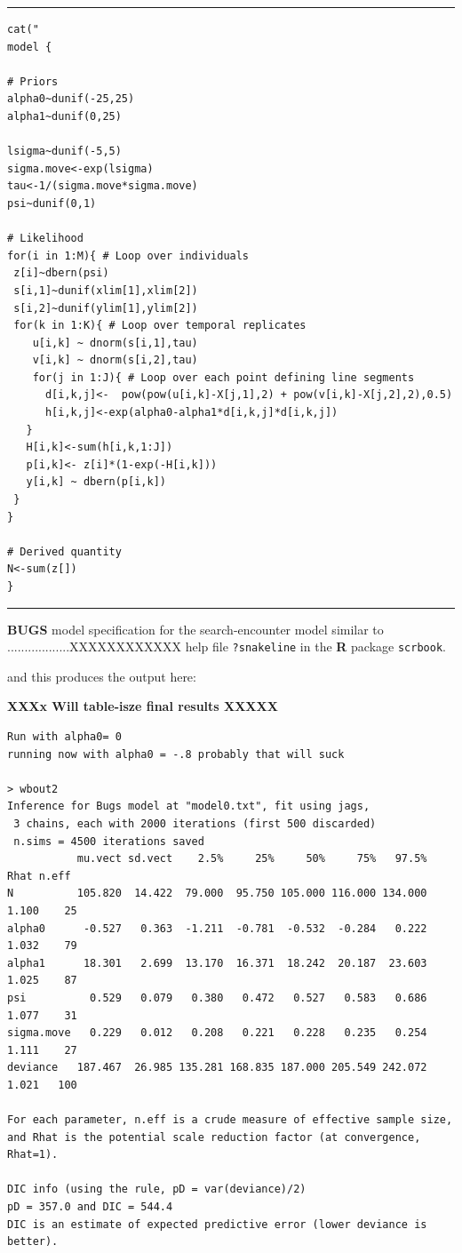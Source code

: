 \begin{panel}[htp]
\centering
\rule[0.15in]{\textwidth}{.03in}
{\small
\begin{verbatim}
cat("
model {

# Priors
alpha0~dunif(-25,25)
alpha1~dunif(0,25)

lsigma~dunif(-5,5)
sigma.move<-exp(lsigma)
tau<-1/(sigma.move*sigma.move)
psi~dunif(0,1)

# Likelihood
for(i in 1:M){ # Loop over individuals
 z[i]~dbern(psi)
 s[i,1]~dunif(xlim[1],xlim[2])
 s[i,2]~dunif(ylim[1],ylim[2])
 for(k in 1:K){ # Loop over temporal replicates
    u[i,k] ~ dnorm(s[i,1],tau)
    v[i,k] ~ dnorm(s[i,2],tau)
    for(j in 1:J){ # Loop over each point defining line segments
      d[i,k,j]<-  pow(pow(u[i,k]-X[j,1],2) + pow(v[i,k]-X[j,2],2),0.5)
      h[i,k,j]<-exp(alpha0-alpha1*d[i,k,j]*d[i,k,j])
   }
   H[i,k]<-sum(h[i,k,1:J])
   p[i,k]<- z[i]*(1-exp(-H[i,k]))
   y[i,k] ~ dbern(p[i,k])
 }
}

# Derived quantity
N<-sum(z[])
}
\end{verbatim}
}
\rule[-0.15in]{\textwidth}{.03in}
\caption{
{\bf BUGS} model specification for the search-encounter model similar
to ..................XXXXXXXXXXXX
help file \mbox{\tt ?snakeline} in the {\bf R} package \mbox{\tt scrbook}.
}
\label{search-encounter.panel.design1}
\end{panel}


and this produces the output here:

{\bf XXXx Will table-isze final results XXXXX}

\begin{verbatim}
Run with alpha0= 0
running now with alpha0 = -.8 probably that will suck

> wbout2
Inference for Bugs model at "model0.txt", fit using jags,
 3 chains, each with 2000 iterations (first 500 discarded)
 n.sims = 4500 iterations saved
           mu.vect sd.vect    2.5%     25%     50%     75%   97.5%  Rhat n.eff
N          105.820  14.422  79.000  95.750 105.000 116.000 134.000 1.100    25
alpha0      -0.527   0.363  -1.211  -0.781  -0.532  -0.284   0.222 1.032    79
alpha1      18.301   2.699  13.170  16.371  18.242  20.187  23.603 1.025    87
psi          0.529   0.079   0.380   0.472   0.527   0.583   0.686 1.077    31
sigma.move   0.229   0.012   0.208   0.221   0.228   0.235   0.254 1.111    27
deviance   187.467  26.985 135.281 168.835 187.000 205.549 242.072 1.021   100

For each parameter, n.eff is a crude measure of effective sample size,
and Rhat is the potential scale reduction factor (at convergence, Rhat=1).

DIC info (using the rule, pD = var(deviance)/2)
pD = 357.0 and DIC = 544.4
DIC is an estimate of expected predictive error (lower deviance is better).
\end{verbatim}




